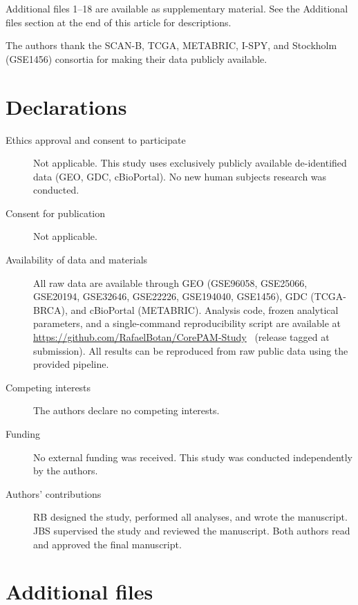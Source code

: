\documentclass[referee,lineno,pdflatex,sn-vancouver-num]{sn-jnl}
\begin{document}

Additional files 1--18 are available as supplementary material. See the Additional files section at the end of this article for descriptions.


The authors thank the SCAN-B, TCGA, METABRIC, I-SPY, and Stockholm (GSE1456) consortia for making their data publicly available.

\section*{Declarations}

\begin{description}
\item[Ethics approval and consent to participate] Not applicable. This study uses exclusively publicly available de-identified data (GEO, GDC, cBioPortal). No new human subjects research was conducted.
\item[Consent for publication] Not applicable.
\item[Availability of data and materials] All raw data are available through GEO (GSE96058, GSE25066, GSE20194, GSE32646, GSE22226, GSE194040, GSE1456), GDC (TCGA-BRCA), and cBioPortal (METABRIC). Analysis code, frozen analytical parameters, and a single-command reproducibility script are available at \url{https://github.com/RafaelBotan/CorePAM-Study}~\cite{botan2026} (release tagged at submission). All results can be reproduced from raw public data using the provided pipeline.
\item[Competing interests] The authors declare no competing interests.
\item[Funding] No external funding was received. This study was conducted independently by the authors.
\item[Authors' contributions] RB designed the study, performed all analyses, and wrote the manuscript. JBS supervised the study and reviewed the manuscript. Both authors read and approved the final manuscript.
\end{description}

\section*{Additional files}
\end{document}
